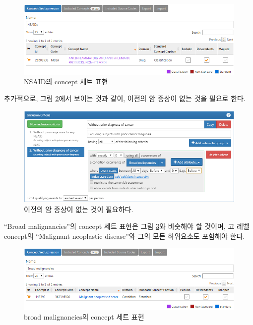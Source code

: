 \documentclass[11pt]{book}
\theoremstyle{definition}
\theoremstyle{definition}
\theoremstyle{definition}
\theoremstyle{remark}
\begin{document}
\begin{figure}

{\centering \includegraphics[width=1\linewidth]{images/SuggestedAnswers/cohortsAtlasConceptSet2} 

}

\caption{NSAID의 concept 세트 표현}\label{fig:cohortsAtlasConceptSet2}
\end{figure}

추가적으로, 그림 \ref{fig:cohortsAtlasInclusion2}에서 보이는 것과 같이,
이전의 암 증상이 없는 것을 필요로 한다.

\begin{figure}

{\centering \includegraphics[width=1\linewidth]{images/SuggestedAnswers/cohortsAtlasInclusion2} 

}

\caption{이전의 암 증상이 없는 것이 필요하다.}\label{fig:cohortsAtlasInclusion2}
\end{figure}

``Broad malignancies''의 concept 세트 표현은 그림
\ref{fig:cohortsAtlasConceptSet3}와 비슷해야 할 것이며, 고 레벨
concept의 ``Malignant neoplastic disease''와 그의 모든 하위요소도
포함해야 한다.

\begin{figure}

{\centering \includegraphics[width=1\linewidth]{images/SuggestedAnswers/cohortsAtlasConceptSet3} 

}

\caption{broad malignancies의 concept 세트 표현}\label{fig:cohortsAtlasConceptSet3}
\end{figure}
\end{document}
